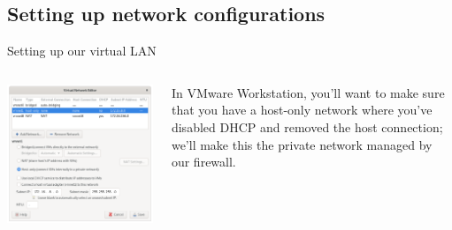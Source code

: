 \documentclass[bigger,aspectratio=169]{beamer}
\begin{document}
\subsection{Setting up network configurations}
\label{sec:orgc20c062}

\begin{frame}{Setting up our virtual LAN}
  \begin{columns}
    \begin{column}{.45\textwidth}
      \vfill
      \includegraphics[width=\linewidth]{./assets/vnet-config.png}
      \vfill
    \end{column}
    \begin{column}{.45\textwidth}
      \vfill
      In VMware Workstation, you'll want to make sure that you have a host-only network
      where you've disabled DHCP and removed the host connection; we'll make this the
      private network managed by our firewall.
      \vfill
    \end{column}
  \end{columns}
\end{frame}
\end{document}

